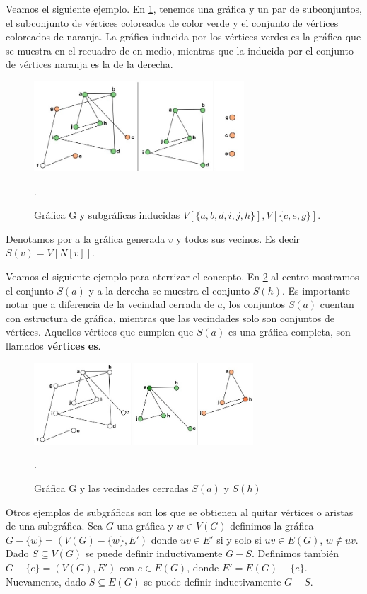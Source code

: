 Veamos el siguiente ejemplo.
En \cref{fig:04}, tenemos una gráfica y un par de subconjuntos, el subconjunto de vértices coloreados de color verde y el conjunto de vértices coloreados de naranja. La gráfica inducida por los vértices verdes es la gráfica que se muestra en el recuadro de en medio, mientras que la inducida por el conjunto de vértices naranja es la de la derecha.

\begin{figure}[H]
  \centering
  \includegraphics[width=0.7\textwidth]{recursos/capturas/09.jpg}
  \caption{Gráfica G y subgráficas inducidas $V[\{ a,b,d,i,j,h\}], V[\{ c,e,g\}]$.}.
  \label{fig:04}
\end{figure}

Denotamos por  a la gráfica generada $v$ y todos sus vecinos. Es decir $S(v)=V[N[v]]$.

Veamos el siguiente ejemplo para aterrizar el concepto.
En \cref{fig:05} al centro mostramos el conjunto $S(a)$ y a la derecha se muestra el conjunto $S(h)$.
Es importante notar que a diferencia de la vecindad cerrada de $a$, los conjuntos $S(a)$ cuentan con estructura de gráfica, mientras que las vecindades solo son conjuntos de vértices. Aquellos vértices que cumplen que $S(a)$ es una gráfica completa, son llamados \textbf{vértices} \textbf{es}.

\begin{figure}[H]
  \centering
  \includegraphics[width=0.73\textwidth]{recursos/capturas/10.jpg}
  \caption{Gráfica G y las vecindades cerradas $S(a)$ y $S(h)$}.
  \label{fig:05}
\end{figure}

Otros ejemplos de subgráficas son los que se obtienen al quitar vértices o aristas de una subgráfica. Sea $G$ una gráfica y $w\in V(G)$ definimos la gráfica $G-\{w\}=(V(G)-\{w\}, E')$ donde $uv\in E'$ si y solo si $uv\in E(G)$, $w\notin uv$. Dado $S\subseteq V(G)$ se puede definir inductivamente $G-S$.
Definimos también $G-\{e\}=(V(G),E')$ con $e\in E(G)$, donde $E'=E(G)-\{e\}$. Nuevamente, dado $S\subseteq E(G)$ se puede definir inductivamente $G-S$.


